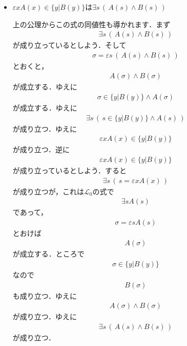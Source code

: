 \documentclass[a4j,10.5pt,oneside,openany]{jsbook}
\theoremstyle{mystyle}
\begin{document}
\begin{itemize}
		\item $\varepsilon x A(x) \in \{y|B(y)\}$は$\exists s\, \left(\, A(s) \wedge B(s)\, \right)$
			
			上の公理からこの式の同値性も導かれます．まず
			\begin{align}
				\exists s\, \left(\, A(s) \wedge B(s)\, \right)
			\end{align}
			が成り立っているとしよう．そして
			\begin{align}
				\sigma = \varepsilon s\, \left(\, A(s) \wedge B(s)\, \right)
			\end{align}
			とおくと，
			\begin{align}
				A(\sigma) \wedge B(\sigma)
			\end{align}
			が成立する．ゆえに
			\begin{align}
				\sigma \in \{y|B(y)\} \wedge A(\sigma)
			\end{align}
			が成立する．ゆえに
			\begin{align}
				\exists s\, \left(\, s \in \{y|B(y)\} \wedge A(s)\, \right)
			\end{align}
			が成り立つ．ゆえに
			\begin{align}
				\varepsilon x A(x) \in \{y|B(y)\}
			\end{align}
			が成り立つ．逆に
			\begin{align}
				\varepsilon x A(x) \in \{y|B(y)\}
			\end{align}
			が成り立っているとしよう．すると
			\begin{align}
				\exists s\, \left(\, s = \varepsilon x A(x)\, \right)
			\end{align}
			が成り立つが，これは$\mathcal{L}_{0}$の式で
			\begin{align}
				\exists s A(s)
			\end{align}
			であって，
			\begin{align}
				\sigma = \varepsilon s A(s)
			\end{align}
			とおけば
			\begin{align}
				A(\sigma)
			\end{align}
			が成立する．ところで
			\begin{align}
				\sigma \in \{y|B(y)\}
			\end{align}
			なので
			\begin{align}
				B(\sigma)
			\end{align}
			も成り立つ．ゆえに
			\begin{align}
				A(\sigma) \wedge B(\sigma)
			\end{align}
			が成り立つ．ゆえに
			\begin{align}
				\exists s\, \left(\, A(s) \wedge B(s)\, \right)
			\end{align}
			が成り立つ．
			

\end{itemize}
\end{document}
